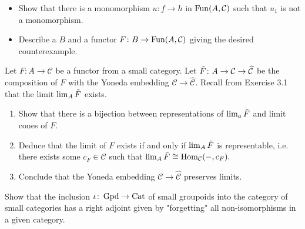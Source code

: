 \begin{Exercise}
\begin{enumerate}[label=(\alph*)]
\begin{itemize}
            \item 
            Show that there is a monomorphism $ u \colon f \to h $ in $\operatorname{Fun} ( A , \mathcal{C} )$ such that $ u_1 $ is not a monomorphism.
    
            \item 
            Describe a $ B $ and a functor $ F  \colon B \to \operatorname{Fun} ( A , \mathcal{C} ) $ giving the desired counterexample.
            
        \end{itemize}
    \end{enumerate}
\end{Exercise}

\begin{Exercise}
    Let $ F \colon A \to \mathcal{ C } $ be a functor from a small category. Let $ \Tilde{ F } \colon A \to  \mathcal{ C } \to \widehat{ \mathcal{ C } } $ be the composition of $ F $ with the Yoneda embedding $ \mathcal{ C } \to \widehat{ \mathcal{ C } } $. Recall from Exercise 3.1 that the limit $ \lim_A \Tilde{ F } $ exists.
    
    \begin{enumerate}[label=(\alph*)]
        \item 
        Show that there is a bijection between representations of $\lim_a \Tilde{ F } $ and limit cones of $ F $.
    
        \item 
        Deduce that the limit of $ F $ exists if and only if $ \lim_A \Tilde{ F } $ is representable, i.e. there exists some $ c_F \in \mathcal{ C } $ such that $ \lim_A  \Tilde{ F } \cong \operatorname{Hom}_{ \mathcal{ C } } ( - , c_F ) . $ 
    
        \item 
        Conclude that the Yoneda embedding $ \mathcal{ C } \to \widehat{ \mathcal{ C } } $ preserves limits.
    \end{enumerate}
\end{Exercise}

\begin{Exercise}
    Show that the inclusion $ \iota \colon \operatorname{Gpd} \to \operatorname{Cat} $ of small groupoids into the category of small categories has a right adjoint given by "forgetting" all non-isomorphisms in a given category.
\end{Exercise}

